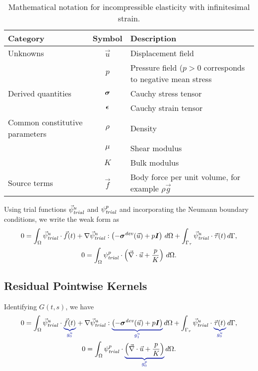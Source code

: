 \begin{table}[htbp]
  \caption{Mathematical notation for incompressible elasticity with
    infinitesimal strain.}
  \label{tab:notation:incompressible:elasticity}
  \begin{tabular}{lcp{3.5in}}
    \toprule
    {\bf Category} & {\bf Symbol} & {\bf Description} \\
    \midrule
    Unknowns & $\vec{u}$ & Displacement field \\
    & $p$ & Pressure field ($p>0$ corresponds to negative mean stress \\
    Derived quantities & $\tensor{\sigma}$ & Cauchy stress tensor \\
                   & $\tensor{\epsilon}$ & Cauchy strain tensor \\
    Common constitutive parameters & $\rho$ & Density \\
  & $\mu$ & Shear modulus \\
  & $K$ & Bulk modulus \\
Source terms & $\vec{f}$ & Body force per unit volume, for example $\rho \vec{g}$ \\
    \bottomrule
  \end{tabular}
\end{table}

Using trial functions $\trialvec[u]$ and $\trialscalar[p]$ and
incorporating the Neumann boundary conditions, we write the weak form
as
\begin{gather}
  0 = 
  \int_\Omega \trialvec[u] \cdot \vec{f}(t) + \nabla \trialvec[u] : \left(-\tensor{\sigma}^\mathit{dev}(\vec{u}) + p\tensor{I}
  \right)\, d\Omega + \int_{\Gamma_\tau} \trialvec[u] \cdot \vec{\tau}(t) \, d\Gamma, \\
  0 = \int_\Omega \trialscalar[p] \cdot \left(\vec{\nabla} \cdot \vec{u} + \frac{p}{K} \right) 
\, d\Omega.
\end{gather}

\subsection{Residual Pointwise Kernels}

Identifying $G(t,s)$, we have
\begin{gather}
  \label{eqn:incompressible:elasticity:displacement}
  0 = \int_\Omega \trialvec[u] \cdot \eqnannotate{\vec{f}(t)}{g_0^u} + \nabla \trialvec[u] :
  \eqnannotate{\left(-\tensor{\sigma}^\mathit{dev}(\vec{u}) + p\tensor{I}\right)}{g_1^u}  \, d\Omega
  + \int_{\Gamma_\tau} \trialvec[u] \cdot \eqnannotate{\vec{\tau}(t)}{g_0^u} \, d\Gamma, \\
%
  \label{eqn:incompressible:elasticity:pressure}
  0 = \int_\Omega \trialscalar[p] \cdot \eqnannotate{\left(\vec{\nabla} \cdot \vec{u} + 
\frac{p}{K} \right)}{g_0^p} \, d\Omega.
\end{gather}

